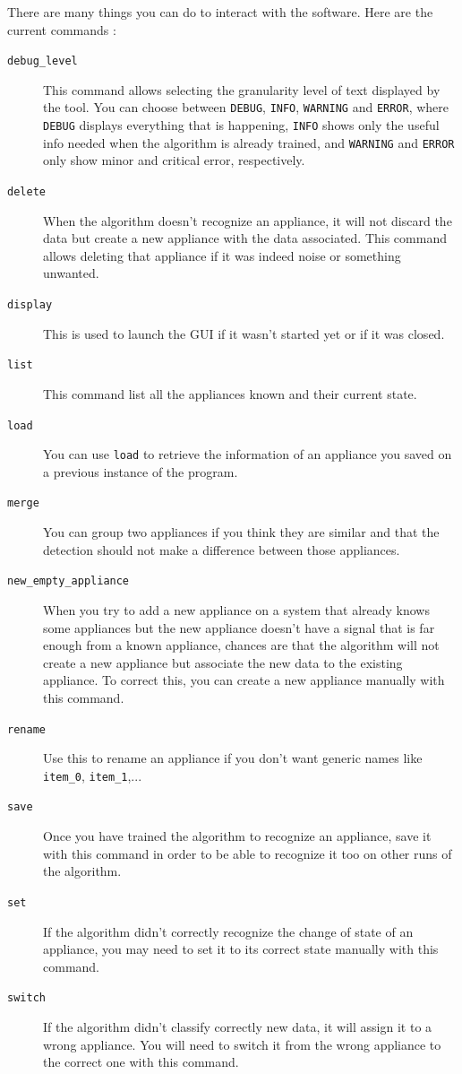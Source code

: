 There are many things you can do to interact with the software. Here are the current commands :
\begin{description}
\item[\texttt{debug\_level}]This command allows selecting the granularity level of text displayed by the tool. You can choose between \texttt{DEBUG}, \texttt{INFO}, \texttt{WARNING} and \texttt{ERROR}, where \texttt{DEBUG} displays everything that is happening, \texttt{INFO} shows only the useful info needed when the algorithm is already trained, and \texttt{WARNING} and \texttt{ERROR} only show minor and critical error, respectively.
\item[\texttt{delete}] When the algorithm doesn't recognize an appliance, it will not discard the data but create a new appliance with the data associated. This command allows deleting that appliance if it was indeed noise or something unwanted.
\item[\texttt{display}] This is used to launch the GUI if it wasn't started yet or if it was closed.
\item[\texttt{list}] This command list all the appliances known and their current state.
\item[\texttt{load}] You can use \texttt{load} to retrieve the information of an appliance you saved on a previous instance of the program.
\item[\texttt{merge}] You can group two appliances if you think they are similar and that the detection should not make a difference between those appliances.
\item[\texttt{new\_empty\_appliance}] When you try to add a new appliance on a system that already knows some appliances but the new appliance doesn't have a signal that is far enough from a known appliance, chances are that the algorithm will not create a new appliance but associate the new data to the existing appliance. To correct this, you can create a new appliance manually with this command.
\item[\texttt{rename}] Use this to rename an appliance if you don't want generic names like \texttt{item\_0}, \texttt{item\_1},...
\item[\texttt{save}] Once you have trained the algorithm to recognize an appliance, save it with this command in order to be able to recognize it too on other runs of the algorithm.
\item[\texttt{set}] If the algorithm didn't correctly recognize the change of state of an appliance, you may need to set it to its correct state manually with this command.
\item[\texttt{switch}] If the algorithm didn't classify correctly new data, it will assign it to a wrong appliance. You will need to switch it from the wrong appliance to the correct one with this command.
\end{description}

